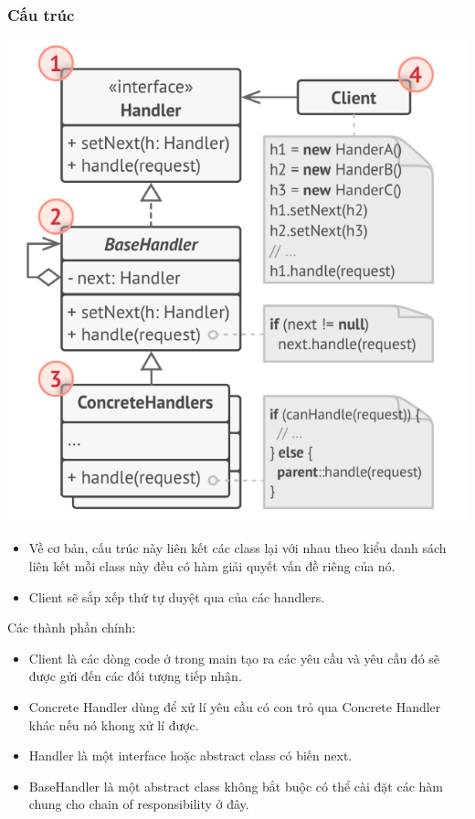 \subsubsection{Cấu trúc}
\begin{center}
    \includegraphics[scale= 0.45]{image/behavioral/cor.png}
\end{center}
\begin{itemize}
    \item Về cơ bản, cấu trúc này liên kết các class lại với nhau theo kiểu danh sách liên kết mỗi class này đều có hàm giải quyết vấn đề riêng của nó.
    \item Client sẽ sắp xếp thứ tự duyệt qua của các handlers.
\end{itemize}
Các thành phần chính:
\begin{itemize}
    \item Client là các dòng code ở trong main tạo ra các yêu cầu và yêu cầu đó sẽ được gửi đến các đối tượng tiếp nhận.
    \item Concrete Handler dùng để xử lí yêu cầu có con trỏ qua Concrete Handler khác nếu nó khong xử lí được.
    \item Handler là một interface hoặc abstract class có biến next.
    \item BaseHandler là một abstract class không bắt buộc có thể cài đặt các hàm chung cho chain of responsibility ở đây.
\end{itemize}
